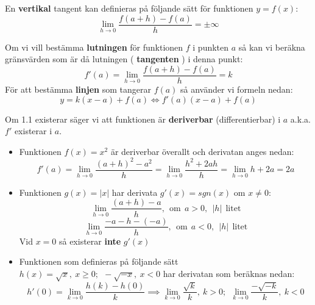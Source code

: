 \documentclass{report}
\begin{document}
\noindent
En \textbf{vertikal} tangent kan definieras på följande sätt för funktionen $ y = f(x) $:
\begin{equation*}
\lim_{h \to 0} \frac{f(a+h)-f(a)}{h} = \pm \infty
\end{equation*}

{
Om vi vill bestämma \textbf{lutningen} för funktionen $ f $ i punkten $ a $ så kan vi beräkna gränsvärden som är då lutningen ( \textbf{tangenten} ) i denna punkt:
\begin{equation}
f'(a) = \lim_{h \to 0 } \frac{f(a+h)-f(a)}{h} = k
\end{equation}
För att bestämma \textbf{linjen} som tangerar $ f(a) $ så använder vi formeln nedan:
\begin{equation*}
y = k(x-a) + f(a) \iff f'(a)(x-a)+f(a)
\end{equation*}

Om 1.1 existerar säger vi att funktionen är \textbf{deriverbar} (differentierbar) i $ a $ a.k.a. $ f' $ existerar i $ a $.  
}

{
\begin{itemize}
	\item Funktionen $ f(x) = x^2 $ är deriverbar överallt och derivatan anges nedan:
\begin{equation*}
	f'(a) = \lim_{h \to 0} \frac{(a+h)^2-a^2}{h} = \lim_{h \to 0} \frac{h^2+2ah}{h} = \lim_{h \to 0} h+2a = 2a 
\end{equation*}

	\item Funktionen $ g(x) = |x| $ har derivata $ g'(x) = sgn(x) $ om $ x \ne 0 $:
\begin{equation*}
\lim_{h \to 0} \frac{(a+h)-a}{h},\:\: \text{om}\:\: a > 0,\:\:|h|\:\:\text{litet}  
\end{equation*}
\begin{equation*}
\lim_{h \to 0} \frac{-a-h-(-a)}{h},\:\: \text{om}\:\: a < 0,\:\:|h|\:\: \text{litet}  
\end{equation*}
Vid $ x = 0 $ så existerar \textbf{inte} $ g'(x) $ 
	\item Funktionen som definieras på följande sätt $ h(x) = \sqrt{x},\:x \ge 0;\:\: - \sqrt{-x},\:x < 0 $ har derivatan som beräknas nedan:
\begin{equation*}
h'(0) = \lim_{k \to 0} \frac{h(k)-h(0)}{k} \implies \lim_{k \to 0} \frac{ \sqrt{k} }{k},\: k > 0;\:\: \lim_{k \to 0} \frac{- \sqrt{-k} }{k},\:k < 0 
\end{equation*}
\end{itemize}
}
\end{document}
